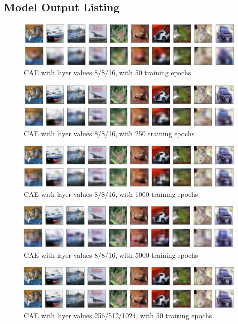\documentclass{article}
\begin{document}
\newpage
\begin{appendices}


\section{Model Output Listing} \label{modelouts}
\begin{figure}[H]
    \centering
    \includegraphics[width=4.75in]{csci-8110/hw-1/hw1-images/8-8-16-50.png}
    \caption{CAE with layer values 8/8/16, with 50 training epochs}
    \label{fig:final}
\end{figure}
\begin{figure}[H]
    \centering
    \includegraphics[width=4.75in]{csci-8110/hw-1/hw1-images/8-8-16-250.png}
    \caption{CAE with layer values 8/8/16, with 250 training epochs}
    \label{fig:final}
\end{figure}
\begin{figure}[H]
    \centering
    \includegraphics[width=4.75in]{csci-8110/hw-1/hw1-images/8-8-16-1000.png}
    \caption{CAE with layer values 8/8/16, with 1000 training epochs}
    \label{fig:final}
\end{figure}
\begin{figure}[H]
    \centering
    \includegraphics[width=4.75in]{csci-8110/hw-1/hw1-images/8-8-16-5000.png}
    \caption{CAE with layer values 8/8/16, with 5000 training epochs}
    \label{fig:final}
\end{figure}
\begin{figure}[H]
    \centering
    \includegraphics[width=4.75in]{csci-8110/hw-1/hw1-images/256-512-1024-50.png}
    \caption{CAE with layer values 256/512/1024, with 50 training epochs}
    \label{fig:final}
\end{figure}


\end{appendices}
\end{document}
